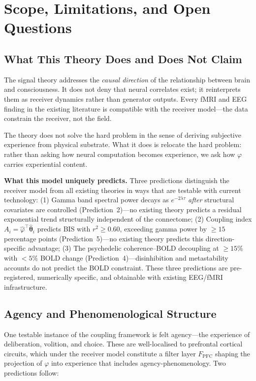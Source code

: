 \documentclass[12pt]{article}
\begin{document}
\section{Scope, Limitations, and Open Questions}

\subsection{What This Theory Does and Does Not Claim}

The signal theory addresses the \textit{causal direction} of the relationship between brain and consciousness. It does not deny that neural correlates exist; it reinterprets them as receiver dynamics rather than generator outputs. Every fMRI and EEG finding in the existing literature is compatible with the receiver model---the data constrain the receiver, not the field.

The theory does not solve the hard problem in the sense of deriving subjective experience from physical substrate. What it does is relocate the hard problem: rather than asking how neural computation becomes experience, we ask how $\varphi$ carries experiential content.

\textbf{What this model uniquely predicts.} Three predictions distinguish the receiver model from all existing theories in ways that are testable with current technology: (1) Gamma band spectral power decays as $e^{-2\lambda\tau}$ \emph{after} structural covariates are controlled (Prediction~2)---no existing theory predicts a residual exponential trend structurally independent of the connectome; (2) Coupling index $A_i = \hat{\varphi}^\top\hat{\boldsymbol{\theta}}_i$ predicts BIS with $r^2 \geq 0.60$, exceeding gamma power by $\geq 15$ percentage points (Prediction~5)---no existing theory predicts this direction-specific advantage; (3) The psychedelic coherence--BOLD decoupling at $\geq 15\%$ with $< 5\%$ BOLD change (Prediction~4)---disinhibition and metastability accounts do not predict the BOLD constraint. These three predictions are pre-registered, numerically specific, and obtainable with existing EEG/fMRI infrastructure.

\subsection{Agency and Phenomenological Structure}

One testable instance of the coupling framework is felt agency---the experience of deliberation, volition, and choice. These are well-localised to prefrontal cortical circuits, which under the receiver model constitute a filter layer $F_{\mathrm{PFC}}$ shaping the projection of $\varphi$ into experience that includes agency-phenomenology. Two predictions follow:
\end{document}
